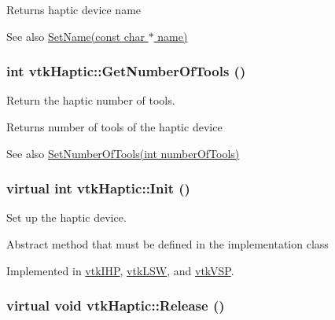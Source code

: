 \begin{DoxyReturn}{Returns}
haptic device name 
\end{DoxyReturn}
\begin{DoxySeeAlso}{See also}
\hyperlink{classvtkHaptic_a03c7815125924b8771372879ad367e09}{SetName(const char $\ast$ name)} 
\end{DoxySeeAlso}
\hypertarget{classvtkHaptic_a6572234c6e1448d8244d1ae7ebad4985}{
\subsubsection[{GetNumberOfTools}]{\setlength{\rightskip}{0pt plus 5cm}int vtkHaptic::GetNumberOfTools ()}}
\label{classvtkHaptic_a6572234c6e1448d8244d1ae7ebad4985}


Return the haptic number of tools. 

\begin{DoxyReturn}{Returns}
number of tools of the haptic device 
\end{DoxyReturn}
\begin{DoxySeeAlso}{See also}
\hyperlink{classvtkHaptic_a2c0be36812179261262d89ae91c31013}{SetNumberOfTools(int numberOfTools)} 
\end{DoxySeeAlso}
\hypertarget{classvtkHaptic_a164a353869ace1e3b359da03ce873066}{
\subsubsection[{Init}]{\setlength{\rightskip}{0pt plus 5cm}virtual int vtkHaptic::Init ()}}
\label{classvtkHaptic_a164a353869ace1e3b359da03ce873066}


Set up the haptic device. 

Abstract method that must be defined in the implementation class 

Implemented in \hyperlink{classvtkIHP_a055cc6c8150236aa3899647e32c3a0da}{vtkIHP}, \hyperlink{classvtkLSW_a9de1e9f2b2e3a2ad0e7a92b1597ab2f7}{vtkLSW}, and \hyperlink{classvtkVSP_a4b48949e4b916ebd142ef165d9e6897a}{vtkVSP}.

\hypertarget{classvtkHaptic_a6bfd7e7ad232325a84ca586d92b4c3fa}{
\subsubsection[{Release}]{\setlength{\rightskip}{0pt plus 5cm}virtual void vtkHaptic::Release ()}}
\label{classvtkHaptic_a6bfd7e7ad232325a84ca586d92b4c3fa}


